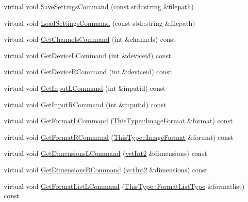 \begin{DoxyCompactItemize}
\item 
virtual void \hyperlink{classsvl_filter_source_video_capture_abbacd31e3f5edfd5b2b2a50c7053bc99}{Save\+Settings\+Command} (const std\+::string \&filepath)
\item 
virtual void \hyperlink{classsvl_filter_source_video_capture_a3850149032cf1d35c30a3638b4481c76}{Load\+Settings\+Command} (const std\+::string \&filepath)
\item 
virtual void \hyperlink{classsvl_filter_source_video_capture_a1dd7a55838ea87f65aad6dd9ed2a7874}{Get\+Channels\+Command} (int \&channels) const 
\item 
virtual void \hyperlink{classsvl_filter_source_video_capture_a651807fb1391fd672e9bd97e598dd243}{Get\+Device\+L\+Command} (int \&deviceid) const 
\item 
virtual void \hyperlink{classsvl_filter_source_video_capture_ad6ec3e7df7121a67d17136126501d5ff}{Get\+Device\+R\+Command} (int \&deviceid) const 
\item 
virtual void \hyperlink{classsvl_filter_source_video_capture_a2fc6b6f712c78c0fdda8cfb62ac2cb35}{Get\+Input\+L\+Command} (int \&inputid) const 
\item 
virtual void \hyperlink{classsvl_filter_source_video_capture_a97e2fe09635eed40583aa6b1b4b51ab7}{Get\+Input\+R\+Command} (int \&inputid) const 
\item 
virtual void \hyperlink{classsvl_filter_source_video_capture_a3947836ef8d61f6201203c4db3614782}{Get\+Format\+L\+Command} (\hyperlink{classsvl_filter_source_video_capture_a0944cc8abe4240701683128c28fa5349}{This\+Type\+::\+Image\+Format} \&format) const 
\item 
virtual void \hyperlink{classsvl_filter_source_video_capture_af2ad11e3109c2162deef43ae9b66465f}{Get\+Format\+R\+Command} (\hyperlink{classsvl_filter_source_video_capture_a0944cc8abe4240701683128c28fa5349}{This\+Type\+::\+Image\+Format} \&format) const 
\item 
virtual void \hyperlink{classsvl_filter_source_video_capture_af1ce86b874a6fe5ef8356bf290dce420}{Get\+Dimensions\+L\+Command} (\hyperlink{vct_fixed_size_vector_types_8h_add8c88eb6a432b15f14b866b9c35325f}{vct\+Int2} \&dimensions) const 
\item 
virtual void \hyperlink{classsvl_filter_source_video_capture_a69e13d8177c9db036b867a53f6196e16}{Get\+Dimensions\+R\+Command} (\hyperlink{vct_fixed_size_vector_types_8h_add8c88eb6a432b15f14b866b9c35325f}{vct\+Int2} \&dimensions) const 
\item 
virtual void \hyperlink{classsvl_filter_source_video_capture_a8f6d51e949b294c7d30d17fe98755abd}{Get\+Format\+List\+L\+Command} (\hyperlink{classsvl_filter_source_video_capture_af6d31bdf8807755322cd7e5ef1f0d8d9}{This\+Type\+::\+Format\+List\+Type} \&formatlist) const 

\end{DoxyCompactItemize}
